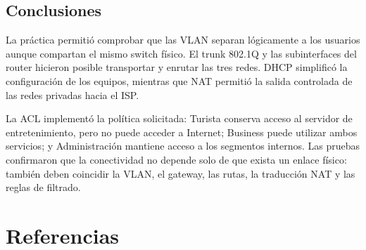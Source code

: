 \documentclass[12pt,a4paper]{article}
\let\oldsection\section
\renewcommand{\section}{\clearpage\oldsection}
\begin{document}

\subsection{Conclusiones}
La práctica permitió comprobar que las VLAN separan lógicamente a los usuarios aunque compartan el mismo switch físico. El trunk 802.1Q y las subinterfaces del router hicieron posible transportar y enrutar las tres redes. DHCP simplificó la configuración de los equipos, mientras que NAT permitió la salida controlada de las redes privadas hacia el ISP.

La ACL implementó la política solicitada: Turista conserva acceso al servidor de entretenimiento, pero no puede acceder a Internet; Business puede utilizar ambos servicios; y Administración mantiene acceso a los segmentos internos. Las pruebas confirmaron que la conectividad no depende solo de que exista un enlace físico: también deben coincidir la VLAN, el gateway, las rutas, la traducción NAT y las reglas de filtrado.

\section{Referencias}
\end{document}
